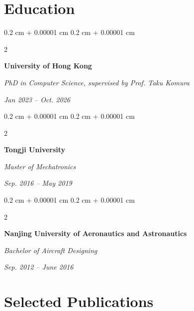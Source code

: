 \documentclass[10pt, letterpaper]{article}
\newenvironment{highlights}{
    \begin{itemize}[
        topsep=0.10 cm,
        parsep=0.10 cm,
        partopsep=0pt,
        itemsep=0pt,
        leftmargin=0.4 cm + 10pt
    ]
}{
    \end{itemize}
} %
\newenvironment{onecolentry}{
    \begin{adjustwidth}{
        0.2 cm + 0.00001 cm
    }{
        0.2 cm + 0.00001 cm
    }
}{
    \end{adjustwidth}
} %
\newenvironment{twocolentry}[2][]{
    \onecolentry
    \def\secondColumn{#2}
    \setcolumnwidth{\fill, 4.5 cm}
    \begin{paracol}{2}
}{
    \switchcolumn \raggedleft \secondColumn
    \end{paracol}
    \endonecolentry
} %
\let\hrefWithoutArrow\href
\renewcommand{\href}[2]{\hrefWithoutArrow{#1}{\ifthenelse{\equal{#2}{}}{ }{#2 }\raisebox{.15ex}{\footnotesize \faExternalLink*}}}
\begin{document}
    \section{Education}



        
        \begin{twocolentry}{
            
            
        \textit{Jan 2023 – Oct. 2026}}
            \textbf{University of Hong Kong}

            \textit{PhD in Computer Science, supervised by Prof. Taku Komura}
        \end{twocolentry}


        
        \begin{twocolentry}{
            
            
        \textit{Sep. 2016 -- May 2019}}
            \textbf{Tongji University}

            \textit{Master of Mechatronics}
        \end{twocolentry}


        
        \begin{twocolentry}{
            
            
        \textit{Sep. 2012 -- June 2016}}
            \textbf{Nanjing University of Aeronautics and Astronautics}

            \textit{Bachelor of Aircraft Designing }
        \end{twocolentry}



    
    \section{Selected Publications}
\end{document}

